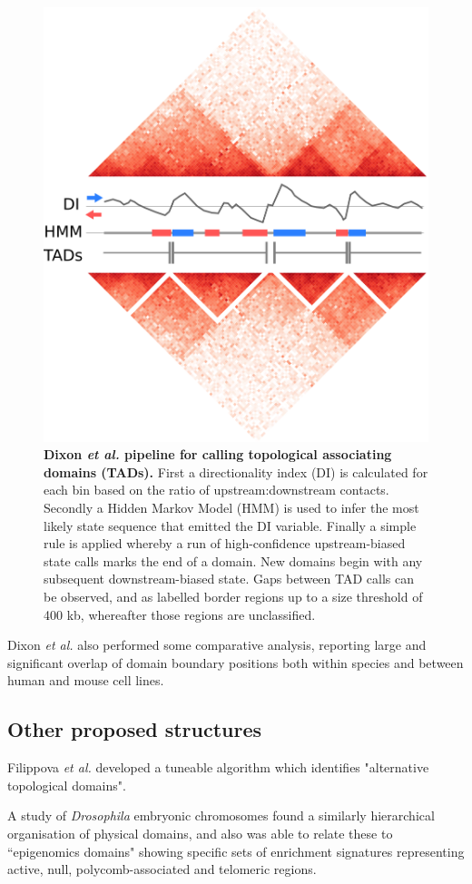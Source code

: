 \documentclass[a4paper,10pt,oneside]{book}
\begin{document}
\begin{figure}
\begin{center}
\includegraphics[width=.5\textwidth]{figs/di_example.png}
\captionsetup{width=1.2\textwidth}
\caption[Dixon \emph{et al.} pipeline for calling topological associating domains (TADs).]{ {\bf Dixon \emph{et al.} pipeline for calling topological associating domains (TADs).} First a directionality index (DI) is calculated for each bin based on the ratio of upstream:downstream contacts. Secondly a Hidden Markov Model (HMM) is used to infer the most likely state sequence that emitted the DI variable. Finally a simple rule is applied whereby a run of high-confidence upstream-biased state calls marks the end of a domain. New domains begin with any subsequent downstream-biased state. Gaps between TAD calls can be observed, and as labelled border regions up to a size threshold of 400 kb, whereafter those regions are unclassified.\cite{Dixon2012}
}\label{fig:dicalc}
\end{center}
\end{figure} 

Dixon \emph{et al.}\cite{Dixon2012} also performed some comparative analysis, reporting large and significant overlap of domain boundary positions both within species and between human and mouse cell lines.

\subsection{Other proposed structures}

Filippova \emph{et al.}\cite{Filippova2014} developed a tuneable algorithm which identifies "alternative topological domains".

A study of \emph{Drosophila} embryonic chromosomes found a similarly hierarchical organisation of physical domains, and also was able to relate these to ``epigenomics domains" showing specific sets of enrichment signatures representing active, null, polycomb-associated and telomeric regions.\cite{Sexton2012} 
\end{document}
